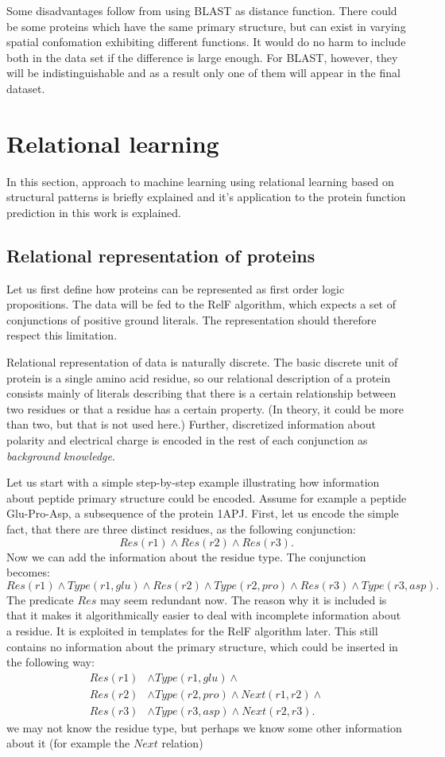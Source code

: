 \documentclass[11pt,twoside,a4paper]{book}
\begin{document}
Some disadvantages follow from using BLAST as distance function.
There could be some proteins which have the same primary structure, 
but can exist in varying spatial confomation exhibiting different functions.
It would do no harm to include both in the data set if the difference is large enough.
For BLAST, however, they will be indistinguishable and as a result 
only one of them will appear in the final dataset.

\section{Relational learning}
In this section, approach to machine learning using relational learning based on structural patterns
is briefly explained and 
it's application to the protein function prediction in this work is explained.

\subsection{Relational representation of proteins}
\label{ssec:relrepr}
Let us first define how proteins can be represented as first order logic propositions.
The data will be fed to the RelF algorithm,
which expects a set of conjunctions of positive ground literals.
The representation should therefore respect this limitation.

Relational representation of data is naturally discrete.
The basic discrete unit of protein is a single amino acid residue,
so our relational description of a protein consists mainly
of literals describing that there is a certain relationship between 
two residues or that a residue has a certain property.
(In theory, it could be more than two, but that is not used here.)
Further, discretized information about polarity and electrical charge
is encoded in the rest of each conjunction as \emph{background knowledge}.

Let us start with a simple step-by-step example illustrating how information about
peptide primary structure could be encoded.
Assume for example a peptide Glu-Pro-Asp, a subsequence of the protein 1APJ.
First, let us encode the simple fact,
that there are three distinct residues, as the following conjunction:
\[ Res(r1) \land Res(r2) \land Res(r3). \]
Now we can add the information about the residue type. The conjunction becomes:
\[ Res(r1) \land Type(r1, glu) \land Res(r2) \land Type(r2, pro) \land Res(r3) \land Type(r3, asp). \]
The predicate $Res$ may seem redundant now.
The reason why it is included is that it makes it algorithmically easier to deal with incomplete information about a residue.
It is exploited in templates for the RelF algorithm later.
This still contains no information about the primary structure, 
which could be inserted in the following way:
\begin{align*}
Res(r1)& \land Type(r1, glu) \land \\
Res(r2)& \land Type(r2, pro) \land Next(r1, r2) \land \\
Res(r3)& \land Type(r3, asp) \land Next(r2, r3). 
\end{align*}
we may not know the residue type, but perhaps we know some other information about it
(for example the $Next$ relation)
\end{document}

